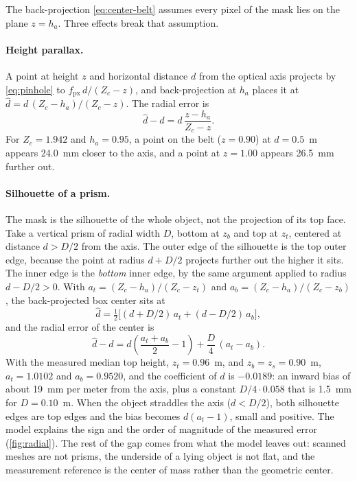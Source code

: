 \documentclass[11pt,a4paper]{article}
\theoremstyle{definition}
\theoremstyle{remark}
\begin{document}
The back-projection \eqref{eq:center-belt} assumes every pixel of the mask lies
on the plane $z = h_a$. Three effects break that assumption.

\paragraph{Height parallax.}
A point at height $z$ and horizontal distance $d$ from the optical axis
projects by \eqref{eq:pinhole} to $f_{\text{px}}\,d/(Z_c-z)$, and
back-projection at $h_a$ places it at $\hat d = d\,(Z_c-h_a)/(Z_c-z)$. The
radial error is
\begin{equation}
\label{eq:parallax}
\hat d - d = d\,\frac{z - h_a}{Z_c - z}.
\end{equation}
For $Z_c = 1.942$ and $h_a = 0.95$, a point on the belt ($z=0.90$) at
$d = 0.5$~m appears 24.0~mm closer to the axis, and a point at $z = 1.00$
appears 26.5~mm further out.

\paragraph{Silhouette of a prism.}
The mask is the silhouette of the whole object, not the projection of its top
face. Take a vertical prism of radial width $D$, bottom at $z_b$ and top at
$z_t$, centered at distance $d > D/2$ from the axis. The outer edge of the
silhouette is the top outer edge, because the point at radius $d+D/2$ projects
further out the higher it sits. The inner edge is the \emph{bottom} inner edge,
by the same argument applied to radius $d - D/2 > 0$. With
$a_t = (Z_c-h_a)/(Z_c-z_t)$ and $a_b = (Z_c-h_a)/(Z_c-z_b)$, the back-projected
box center sits at
\begin{equation}
\hat d = \tfrac12\bigl[(d + D/2)\,a_t + (d - D/2)\,a_b\bigr],
\end{equation}
and the radial error of the center is
\begin{equation}
\label{eq:prism-bias}
\hat d - d = d\left(\frac{a_t+a_b}{2} - 1\right) + \frac{D}{4}\,(a_t - a_b).
\end{equation}
With the measured median top height, $z_t = 0.96$~m, and $z_b = z_s = 0.90$~m,
$a_t = 1.0102$ and $a_b = 0.9520$, and the coefficient of $d$ is $-0.0189$: an
inward bias of about 19~mm per meter from the axis, plus a constant
$D/4\cdot0.058$ that is 1.5~mm for $D = 0.10$~m. When the object straddles the
axis ($d < D/2$), both silhouette edges are top edges and the bias becomes
$d(a_t - 1)$, small and positive. The model explains the sign and the order of
magnitude of the measured error (\cref{fig:radial}). The rest of the gap comes
from what the model leaves out: scanned meshes are not prisms, the underside of
a lying object is not flat, and the measurement reference is the center of
mass rather than the geometric center.
\end{document}
